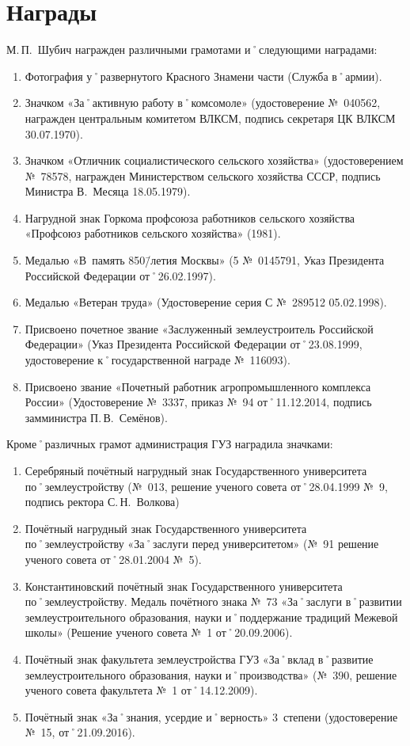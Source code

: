 ﻿\section{Награды}
\noindent М.\,П.~Шубич награжден различными грамотами и˚следующими наградами: 

\begin{enumerate}
	\item Фотография у˚развернутого Красного Знамени части (Служба в˚армии).
	\item Значком «За˚активную работу в˚комсомоле» (удостоверение №~040562, награжден центральным комитетом ВЛКСМ, подпись секретаря ЦК ВЛКСМ 30.07.1970).
	\item Значком «Отличник социалистического сельского хозяйства» (удостоверением №~78578, награжден Министерством сельского хозяйства СССР, подпись Министра В.~Месяца 18.05.1979).
	\item Нагрудной знак Горкома профсоюза работников сельского хозяйства «Профсоюз работников сельского хозяйства» (1981).
	\item Медалью «В~память 850\=/летия Москвы» (5 №~0145791, Указ Президента Российской Федерации от˚26.02.1997).
	\item Медалью «Ветеран труда» (Удостоверение серия С №~289512 05.02.1998).
	\item Присвоено почетное звание «Заслуженный землеустроитель Российской Федерации» (Указ Президента Российской Федерации от˚23.08.1999, удостоверение к˚государственной награде №~116093).
	\item Присвоено звание «Почетный работник агропромышленного комплекса России» (Удостоверение №~3337, приказ №~94 от˚11.12.2014, подпись замминистра П.\,В.~Семёнов).
\end{enumerate}

\noindent Кроме˚различных грамот администрация ГУЗ наградила значками:
\begin{enumerate}	
	\item Серебряный почётный нагрудный знак Государственного университета по˚землеустройству (№~013, решение ученого совета от˚28.04.1999 №~9, подпись ректора С.\,Н.~Волкова) 
	\item Почётный нагрудный знак Государственного университета по˚землеустройству «За˚заслуги перед университетом» (№~91 решение ученого совета от˚28.01.2004 №~5).
	\item Константиновский почётный знак Государственного университета по˚землеустройству. Медаль почётного знака №~73 «За˚заслуги в˚развитии землеустроительного образования, науки и˚поддержание традиций Межевой школы» (Решение ученого совета №~1 от˚20.09.2006).
	\item Почётный знак факультета землеустройства ГУЗ «За˚вклад в˚развитие землеустроительного образования, науки и˚производства» (№~390, решение ученого совета факультета №~1 от˚14.12.2009).
	\item Почётный знак «За˚знания, усердие и˚верность» 3~степени (удостоверение №~15, от˚21.09.2016). 
\end{enumerate}
